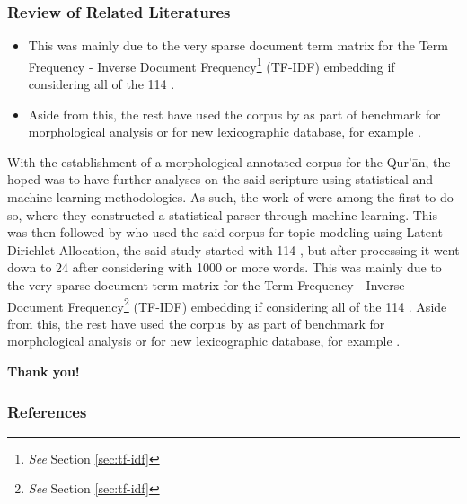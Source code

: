 \documentclass{beamer}
\theoremstyle{definition}
\begin{document}
\begin{frame}[t, fragile]\justifying
    \frametitle{Review of Related Literatures}
    \begin{itemize}
        \item This was mainly due to the very sparse document term matrix for the Term Frequency - Inverse Document Frequency\footnote{\textit{See} Section \ref{sec:tf-idf}} (TF-IDF) embedding if considering all of the 114  .
        \item Aside from this, the rest have used the corpus by \cite{dukes-habash-2010-morphological} as part of benchmark for morphological analysis or for new lexicographic database, for example \cite{sabtan2017morphological, jarrar-hammouda-2024-qabas-open}.
    \end{itemize}
    \end{frame}
    With the establishment of a morphological annotated corpus for the Qur'\=an, the hoped was to have further analyses on the said scripture using statistical and machine learning methodologies. As such, the work of \cite{dukes-habash-2011-one, dukes2015statistical} were among the first to do so, where they constructed a statistical parser through machine learning. This was then followed by \cite{siddiqui2013} who used the said corpus for topic modeling using Latent Dirichlet Allocation, the said study started with 114  , but after processing it went down to 24   after considering   with 1000 or more words. This was mainly due to the very sparse document term matrix for the Term Frequency - Inverse Document Frequency\footnote{\textit{See} Section \ref{sec:tf-idf}} (TF-IDF) embedding if considering all of the 114  . Aside from this, the rest have used the corpus by \cite{dukes-habash-2010-morphological} as part of benchmark for morphological analysis or for new lexicographic database, for example \cite{sabtan2017morphological, jarrar-hammouda-2024-qabas-open}.
\begin{frame}
\begin{center}
\begin{Huge}
\bfseries Thank you!
\end{Huge}
\end{center}
\end{frame}

\begin{frame}[allowframebreaks]
    \frametitle{References}
    \printbibliography
\end{frame}
\end{document}
